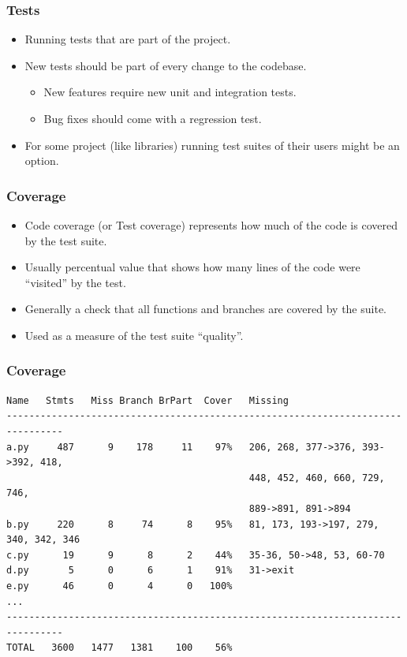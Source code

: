 \documentclass[aspectratio=169]{beamer}
\begin{document}
\begin{frame}
	\frametitle{Tests}
	
	\begin{block}{}
		\begin{itemize}
			\item Running tests that are part of the project.
			\item  New tests should be part of every change to the codebase.
			\begin{itemize}
				\item New features require new unit and integration tests.
				\item Bug fixes should come with a regression test.
			\end{itemize}
			\item For some project (like libraries) running test suites of their users might be an option.
		\end{itemize}
	\end{block}
\end{frame}

\begin{frame}
	\frametitle{Coverage}
	
	\begin{block}{}
		\begin{itemize}
			\item Code coverage (or Test coverage) represents how much of the code is covered by the test suite.
			\item Usually percentual value that shows how many lines of the code were “visited” by the test.
			\item Generally a check that all functions and branches are covered by the suite.
			\item Used as a measure of the test suite “quality”.
		\end{itemize}
	\end{block}
\end{frame}

\begin{frame}[fragile]
	\frametitle{Coverage}
	
\begin{center}
\begin{lstlisting}[frame=none, basicstyle=\ttfamily\small, columns=fullflexible, keepspaces=true]
Name   Stmts   Miss Branch BrPart  Cover   Missing
--------------------------------------------------------------------------------
a.py     487      9    178     11    97%   206, 268, 377->376, 393->392, 418, 
                                           448, 452, 460, 660, 729, 746, 
                                           889->891, 891->894
b.py     220      8     74      8    95%   81, 173, 193->197, 279, 340, 342, 346
c.py      19      9      8      2    44%   35-36, 50->48, 53, 60-70
d.py       5      0      6      1    91%   31->exit
e.py      46      0      4      0   100%
...
--------------------------------------------------------------------------------
TOTAL   3600   1477   1381    100    56%
\end{lstlisting}
	
\end{center}
\end{frame}
\end{document}

